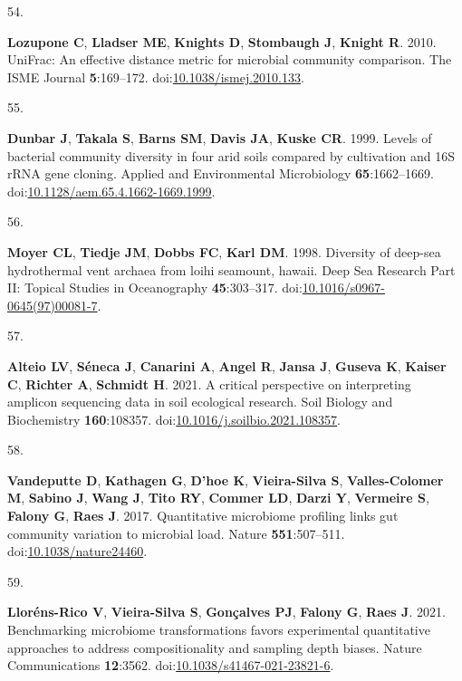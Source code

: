 \documentclass[
]{article}
\newlength{\cslhangindent}
\newlength{\csllabelwidth}
\newlength{\cslentryspacingunit} %
\newenvironment{CSLReferences}[2] %
 {%
  \setlength{\parindent}{0pt}
  \ifodd #1
  \let\oldpar\par
  \def\par{\hangindent=\cslhangindent\oldpar}
  \fi
  \setlength{\parskip}{#2\cslentryspacingunit}
 }%
 {}
\newcommand{\CSLLeftMargin}[1]{\parbox[t]{\csllabelwidth}{#1}}
\newcommand{\CSLRightInline}[1]{\parbox[t]{\linewidth - \csllabelwidth}{#1}\break}
\begin{document}
\begin{CSLReferences}{0}{1}
\leavevmode{}%
\CSLLeftMargin{54. }%
\CSLRightInline{\textbf{Lozupone C}, \textbf{Lladser ME},
\textbf{Knights D}, \textbf{Stombaugh J}, \textbf{Knight R}. 2010.
{UniFrac}: An effective distance metric for microbial community
comparison. The {ISME} Journal \textbf{5}:169--172.
doi:\href{https://doi.org/10.1038/ismej.2010.133}{10.1038/ismej.2010.133}.}

\leavevmode{}%
\CSLLeftMargin{55. }%
\CSLRightInline{\textbf{Dunbar J}, \textbf{Takala S}, \textbf{Barns SM},
\textbf{Davis JA}, \textbf{Kuske CR}. 1999. Levels of bacterial
community diversity in four arid soils compared by cultivation and 16S
{rRNA} gene cloning. Applied and Environmental Microbiology
\textbf{65}:1662--1669.
doi:\href{https://doi.org/10.1128/aem.65.4.1662-1669.1999}{10.1128/aem.65.4.1662-1669.1999}.}

\leavevmode{}%
\CSLLeftMargin{56. }%
\CSLRightInline{\textbf{Moyer CL}, \textbf{Tiedje JM}, \textbf{Dobbs
FC}, \textbf{Karl DM}. 1998. Diversity of deep-sea hydrothermal vent
archaea from loihi seamount, hawaii. Deep Sea Research Part {II}:
Topical Studies in Oceanography \textbf{45}:303--317.
doi:\href{https://doi.org/10.1016/s0967-0645(97)00081-7}{10.1016/s0967-0645(97)00081-7}.}

\leavevmode{}%
\CSLLeftMargin{57. }%
\CSLRightInline{\textbf{Alteio LV}, \textbf{Séneca J}, \textbf{Canarini
A}, \textbf{Angel R}, \textbf{Jansa J}, \textbf{Guseva K},
\textbf{Kaiser C}, \textbf{Richter A}, \textbf{Schmidt H}. 2021. A
critical perspective on interpreting amplicon sequencing data in soil
ecological research. Soil Biology and Biochemistry \textbf{160}:108357.
doi:\href{https://doi.org/10.1016/j.soilbio.2021.108357}{10.1016/j.soilbio.2021.108357}.}

\leavevmode{}%
\CSLLeftMargin{58. }%
\CSLRightInline{\textbf{Vandeputte D}, \textbf{Kathagen G},
\textbf{D'hoe K}, \textbf{Vieira-Silva S}, \textbf{Valles-Colomer M},
\textbf{Sabino J}, \textbf{Wang J}, \textbf{Tito RY}, \textbf{Commer
LD}, \textbf{Darzi Y}, \textbf{Vermeire S}, \textbf{Falony G},
\textbf{Raes J}. 2017. Quantitative microbiome profiling links gut
community variation to microbial load. Nature \textbf{551}:507--511.
doi:\href{https://doi.org/10.1038/nature24460}{10.1038/nature24460}.}

\leavevmode{}%
\CSLLeftMargin{59. }%
\CSLRightInline{\textbf{Lloréns-Rico V}, \textbf{Vieira-Silva S},
\textbf{Gonçalves PJ}, \textbf{Falony G}, \textbf{Raes J}. 2021.
Benchmarking microbiome transformations favors experimental quantitative
approaches to address compositionality and sampling depth biases. Nature
Communications \textbf{12}:3562.
doi:\href{https://doi.org/10.1038/s41467-021-23821-6}{10.1038/s41467-021-23821-6}.}


\end{CSLReferences}
\end{document}
